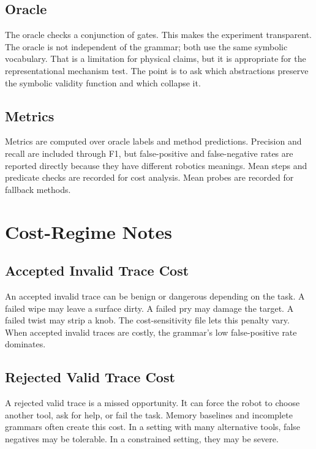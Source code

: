 \documentclass{article}
\begin{document}
\subsection{Oracle}

The oracle checks a conjunction of gates. This makes the experiment transparent. The oracle is not independent of the grammar; both use the same symbolic vocabulary. That is a limitation for physical claims, but it is appropriate for the representational mechanism test. The point is to ask which abstractions preserve the symbolic validity function and which collapse it.

\subsection{Metrics}

Metrics are computed over oracle labels and method predictions. Precision and recall are included through F1, but false-positive and false-negative rates are reported directly because they have different robotics meanings. Mean steps and predicate checks are recorded for cost analysis. Mean probes are recorded for fallback methods.

\section{Cost-Regime Notes}

\subsection{Accepted Invalid Trace Cost}

An accepted invalid trace can be benign or dangerous depending on the task. A failed wipe may leave a surface dirty. A failed pry may damage the target. A failed twist may strip a knob. The cost-sensitivity file lets this penalty vary. When accepted invalid traces are costly, the grammar's low false-positive rate dominates.

\subsection{Rejected Valid Trace Cost}

A rejected valid trace is a missed opportunity. It can force the robot to choose another tool, ask for help, or fail the task. Memory baselines and incomplete grammars often create this cost. In a setting with many alternative tools, false negatives may be tolerable. In a constrained setting, they may be severe.
\end{document}
